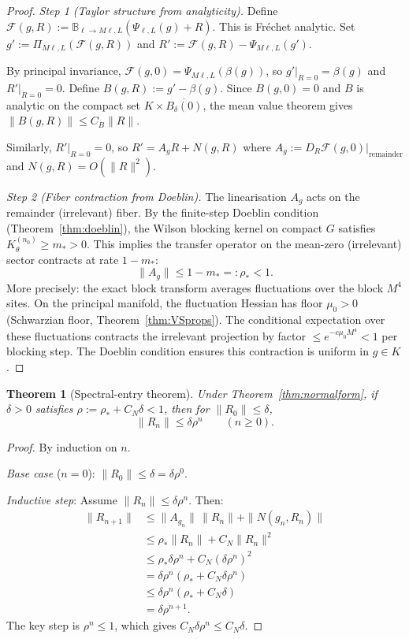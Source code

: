 \documentclass[12pt]{article}
\theoremstyle{plain}
\newtheorem{theorem}{Theorem}[section]
\theoremstyle{definition}
\numberwithin{equation}{section}
\begin{document}
\begin{proof}
\emph{Step 1 (Taylor structure from analyticity).}
Define $\mathcal{F}(g,R):=\mathbb{B}_{\ell\to M\ell,L}(\Psi_{\ell,L}(g)+R)$.  This is Fr\'echet analytic.  Set $g':=\Pi_{M\ell,L}(\mathcal{F}(g,R))$ and $R':=\mathcal{F}(g,R)-\Psi_{M\ell,L}(g')$.

By principal invariance, $\mathcal{F}(g,0)=\Psi_{M\ell,L}(\beta(g))$, so $g'|_{R=0}=\beta(g)$ and $R'|_{R=0}=0$.  Define $B(g,R):=g'-\beta(g)$.  Since $B(g,0)=0$ and $B$ is analytic on the compact set $K\times\overline{B_\delta(0)}$, the mean value theorem gives $\|B(g,R)\|\leq C_B\|R\|$.

Similarly, $R'|_{R=0}=0$, so $R'=A_g R+N(g,R)$ where $A_g:=D_R\mathcal{F}(g,0)|_{\mathrm{remainder}}$ and $N(g,R)=O(\|R\|^2)$.

\emph{Step 2 (Fiber contraction from Doeblin).}
The linearisation $A_g$ acts on the remainder (irrelevant) fiber.  By the finite-step Doeblin condition (Theorem~\ref{thm:doeblin}), the Wilson blocking kernel on compact $G$ satisfies $K_\theta^{(n_0)}\geq m_*>0$.  This implies the transfer operator on the mean-zero (irrelevant) sector contracts at rate $1-m_*$:
\begin{equation}
\|A_g\| \leq 1-m_* =: \rho_* < 1.
\end{equation}
More precisely: the exact block transform averages fluctuations over the block $M^4$ sites.  On the principal manifold, the fluctuation Hessian has floor $\mu_0>0$ (Schwarzian floor, Theorem~\ref{thm:VSprops}).  The conditional expectation over these fluctuations contracts the irrelevant projection by factor $\leq e^{-c\mu_0 M^4}<1$ per blocking step.  The Doeblin condition ensures this contraction is uniform in $g\in K$.
\end{proof}

\begin{theorem}[Spectral-entry theorem]\label{thm:spectralentry}
Under Theorem~\ref{thm:normalform}, if $\delta>0$ satisfies $\rho:=\rho_*+C_N\delta<1$, then for $\|R_0\|\leq\delta$,
\begin{equation}
\boxed{\|R_n\| \leq \delta\rho^n \qquad(n\geq 0).}
\end{equation}
\end{theorem}

\begin{proof}
By induction on $n$.

\emph{Base case} ($n=0$): $\|R_0\|\leq\delta=\delta\rho^0$.

\emph{Inductive step}: Assume $\|R_n\|\leq\delta\rho^n$.  Then:
\begin{align}
\|R_{n+1}\| &\leq \|A_{g_n}\|\,\|R_n\| + \|N(g_n,R_n)\|\\
&\leq \rho_*\|R_n\| + C_N\|R_n\|^2\\
&\leq \rho_*\delta\rho^n + C_N(\delta\rho^n)^2\\
&= \delta\rho^n(\rho_*+C_N\delta\rho^n)\\
&\leq \delta\rho^n(\rho_*+C_N\delta)\\
&= \delta\rho^{n+1}.
\end{align}
The key step is $\rho^n\leq 1$, which gives $C_N\delta\rho^n\leq C_N\delta$.
\end{proof}
\end{document}
